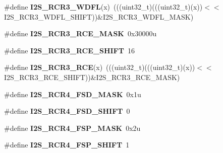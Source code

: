 \begin{DoxyCompactItemize}
\item 
\#define {\bfseries I2\+S\+\_\+\+R\+C\+R3\+\_\+\+W\+D\+FL}(x)~(((uint32\+\_\+t)(((uint32\+\_\+t)(x))$<$$<$I2\+S\+\_\+\+R\+C\+R3\+\_\+\+W\+D\+F\+L\+\_\+\+S\+H\+I\+FT))\&I2\+S\+\_\+\+R\+C\+R3\+\_\+\+W\+D\+F\+L\+\_\+\+M\+A\+SK)\hypertarget{group__I2S__Register__Masks_ga18826ab90db71ce827a4ad913cf66387}{}\label{group__I2S__Register__Masks_ga18826ab90db71ce827a4ad913cf66387}

\item 
\#define {\bfseries I2\+S\+\_\+\+R\+C\+R3\+\_\+\+R\+C\+E\+\_\+\+M\+A\+SK}~0x30000u\hypertarget{group__I2S__Register__Masks_ga1609ba1986cd2320ff34a1308599c93b}{}\label{group__I2S__Register__Masks_ga1609ba1986cd2320ff34a1308599c93b}

\item 
\#define {\bfseries I2\+S\+\_\+\+R\+C\+R3\+\_\+\+R\+C\+E\+\_\+\+S\+H\+I\+FT}~16\hypertarget{group__I2S__Register__Masks_ga1ed5dcaaac88cd06cfc10bb290c7f097}{}\label{group__I2S__Register__Masks_ga1ed5dcaaac88cd06cfc10bb290c7f097}

\item 
\#define {\bfseries I2\+S\+\_\+\+R\+C\+R3\+\_\+\+R\+CE}(x)~(((uint32\+\_\+t)(((uint32\+\_\+t)(x))$<$$<$I2\+S\+\_\+\+R\+C\+R3\+\_\+\+R\+C\+E\+\_\+\+S\+H\+I\+FT))\&I2\+S\+\_\+\+R\+C\+R3\+\_\+\+R\+C\+E\+\_\+\+M\+A\+SK)\hypertarget{group__I2S__Register__Masks_ga7bdf74b0c7537c65dfdb73ef6f966e92}{}\label{group__I2S__Register__Masks_ga7bdf74b0c7537c65dfdb73ef6f966e92}

\item 
\#define {\bfseries I2\+S\+\_\+\+R\+C\+R4\+\_\+\+F\+S\+D\+\_\+\+M\+A\+SK}~0x1u\hypertarget{group__I2S__Register__Masks_ga73d35aef97f3e91b82beb86b19b0b04f}{}\label{group__I2S__Register__Masks_ga73d35aef97f3e91b82beb86b19b0b04f}

\item 
\#define {\bfseries I2\+S\+\_\+\+R\+C\+R4\+\_\+\+F\+S\+D\+\_\+\+S\+H\+I\+FT}~0\hypertarget{group__I2S__Register__Masks_gab4d17b5f07f9c4c8ba9e25ff5352d47c}{}\label{group__I2S__Register__Masks_gab4d17b5f07f9c4c8ba9e25ff5352d47c}

\item 
\#define {\bfseries I2\+S\+\_\+\+R\+C\+R4\+\_\+\+F\+S\+P\+\_\+\+M\+A\+SK}~0x2u\hypertarget{group__I2S__Register__Masks_gadebeb77b006bfdfa2a247a1004b3ed26}{}\label{group__I2S__Register__Masks_gadebeb77b006bfdfa2a247a1004b3ed26}

\item 
\#define {\bfseries I2\+S\+\_\+\+R\+C\+R4\+\_\+\+F\+S\+P\+\_\+\+S\+H\+I\+FT}~1\hypertarget{group__I2S__Register__Masks_gac009d35af5a1ed6a1201d23dbcfcea72}{}\label{group__I2S__Register__Masks_gac009d35af5a1ed6a1201d23dbcfcea72}


\end{DoxyCompactItemize}
